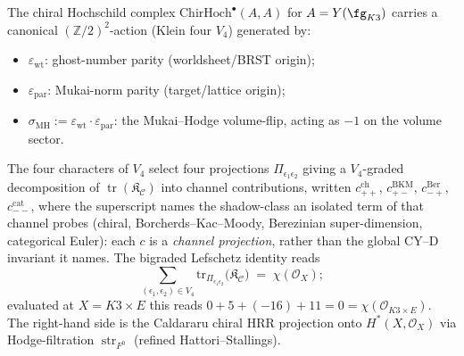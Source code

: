 \begin{theorem}
\label{thm:k3-multiproj-bigraded-lefschetz}
The chiral Hochschild complex
$\mathrm{ChirHoch}^\bullet(A, A)$ for $A = Y(\fg_{K3})$ carries a
canonical $(\mathbb{Z}/2)^2$-action
\textup{(}Klein four $V_4$\textup{)} generated by:
\begin{itemize}
\item $\varepsilon_{\mathrm{wt}}$: ghost-number parity
 \textup{(}worldsheet/BRST origin\textup{)};
\item $\varepsilon_{\mathrm{par}}$: Mukai-norm parity
 \textup{(}target/lattice origin\textup{)};
\item $\sigma_{\mathrm{MH}} := \varepsilon_{\mathrm{wt}} \cdot
 \varepsilon_{\mathrm{par}}$: the Mukai--Hodge volume-flip,
 acting as $-1$ on the volume sector.
\end{itemize}
The four characters of $V_4$ select four projections
$\Pi_{\epsilon_1 \epsilon_2}$ giving a $V_4$-graded decomposition of
$\operatorname{tr}(\mathfrak{K}_{\mathcal{C}})$ into channel
contributions, written
$c_{++}^{\mathrm{ch}}$, $c_{+-}^{\mathrm{BKM}}$,
$c_{-+}^{\mathrm{Ber}}$, $c_{--}^{\mathrm{cat}}$,
where the superscript names the shadow-class an isolated term
of that channel probes \textup{(}chiral, Borcherds--Kac--Moody,
Berezinian super-dimension, categorical Euler\textup{):} each $c$ is a
\emph{channel projection}, rather than the global CY--D invariant it names.
The bigraded Lefschetz identity reads
\[
 \boxed{\;
 \sum_{(\epsilon_1, \epsilon_2) \in V_4}
 \mathrm{tr}_{\Pi_{\epsilon_1 \epsilon_2}}\bigl(\mathfrak{K}_{\mathcal{C}}\bigr)
 \;=\; \chi(\mathcal{O}_X);
 \;}
\]
evaluated at $X = K3 \times E$ this reads
$0 + 5 + (-16) + 11 = 0 = \chi(\mathcal{O}_{K3 \times E})$. The
right-hand side is the Caldararu chiral HRR projection onto
$H^*(X, \mathcal{O}_X)$ via Hodge-filtration
$\operatorname{str}_{F^0}$ \textup{(}refined Hattori--Stallings\textup{).}
\end{theorem}

